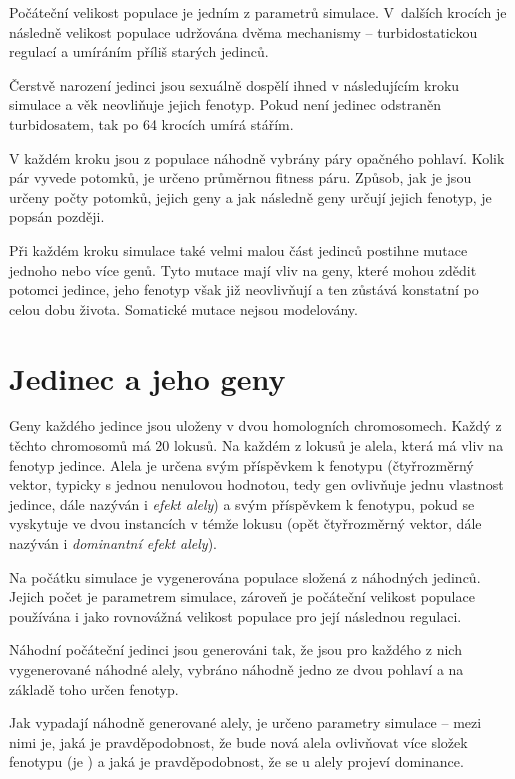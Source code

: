Počáteční velikost populace je jedním z parametrů simulace.  V~dalších krocích je následně velikost populace
udržována dvěma mechanismy -- turbidostatickou regulací a umíráním příliš starých jedinců.

Čerstvě narození jedinci jsou sexuálně dospělí ihned v následujícím kroku simulace a věk neovliňuje jejich fenotyp.
Pokud není jedinec odstraněn turbidosatem, tak po 64 krocích umírá stářím.

V každém kroku jsou z populace náhodně vybrány páry opačného pohlaví.
Kolik pár vyvede potomků, je určeno průměrnou fitness páru. Způsob, jak je jsou určeny počty potomků, jejich geny a
jak následně geny určují jejich fenotyp, je popsán později.

Při každém kroku simulace také velmi malou část jedinců postihne mutace jednoho nebo více genů. Tyto mutace mají
vliv na geny, které mohou zdědit potomci jedince, jeho fenotyp však již neovlivňují a ten zůstává konstatní po celou
dobu života. Somatické mutace nejsou modelovány.

\section{Jedinec a jeho geny}

Geny každého jedince jsou uloženy v dvou homologních chromosomech. Každý z těchto chromosomů má 20 lokusů.
Na každém z lokusů je alela, která má vliv na fenotyp jedince. Alela je určena svým příspěvkem k fenotypu (čtyřrozměrný
vektor, typicky s jednou nenulovou hodnotou, tedy gen ovlivňuje jednu vlastnost jedince, dále nazýván i
\textit{efekt alely}) a svým příspěvkem k fenotypu, pokud se vyskytuje ve dvou instancích v témže lokusu
(opět čtyřrozměrný vektor, dále nazýván i \textit{dominantní efekt alely}).

Na počátku simulace je vygenerována populace složená z náhodných jedinců.
Jejich počet je parametrem simulace, zároveň je počáteční velikost populace používána i jako rovnovážná velikost
populace pro její následnou regulaci.

Náhodní počáteční jedinci jsou generováni tak, že jsou pro každého z nich vygenerované náhodné alely, vybráno náhodně
jedno ze dvou pohlaví a na základě toho určen fenotyp.

Jak vypadají náhodně generované alely, je určeno parametry simulace -- mezi nimi je, jaká je pravděpodobnost, že bude
nová alela ovlivňovat více složek fenotypu (je ) a jaká je pravděpodobnost, že se u alely projeví
dominance.

